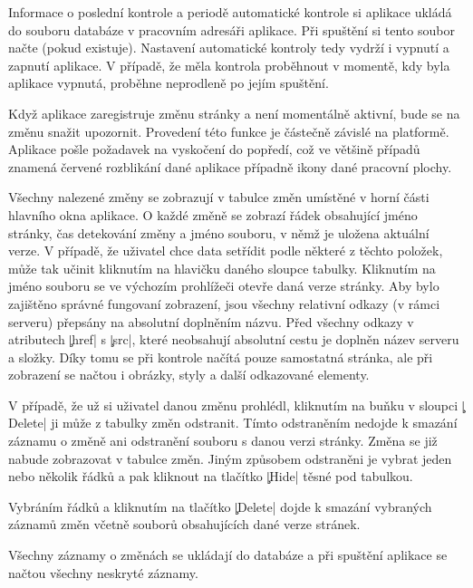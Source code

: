 Informace o poslední kontrole a periodě automatické kontrole si aplikace ukládá do souboru databáze v pracovním adresáři aplikace.
Při spuštění si tento soubor načte (pokud existuje).
Nastavení automatické kontroly tedy vydrží i vypnutí a zapnutí aplikace.
V případě, že měla kontrola proběhnout v momentě, kdy byla aplikace vypnutá, proběhne neprodleně po jejím spuštění.

Když aplikace zaregistruje změnu stránky a není momentálně aktivní, bude se na změnu snažit upozornit.
Provedení této funkce je částečně závislé na platformě. 
Aplikace pošle požadavek na vyskočení do popředí, což ve většině případů znamená červené rozblikání dané aplikace případně ikony dané pracovní plochy.

Všechny nalezené změny se zobrazují v tabulce změn umístěné v horní části hlavního okna aplikace.
O každé změně se zobrazí řádek obsahující jméno stránky, čas detekování změny a jméno souboru, v němž je uložena aktuální verze.
V případě, že uživatel chce data setřídit podle některé z těchto položek, může tak učinit kliknutím na hlavičku daného sloupce tabulky.
Kliknutím na jméno souboru se ve výchozím prohlížeči otevře daná verze stránky.
Aby bylo zajištěno správné fungovaní zobrazení, jsou všechny relativní odkazy (v rámci serveru) přepsány na absolutní doplněním názvu.
Před všechny odkazy v atributech \c|href| s \c|src|, které neobsahují absolutní cestu je doplněn název serveru a složky.
Díky tomu se při kontrole načítá pouze samostatná stránka, ale při zobrazení se načtou i obrázky, styly a další odkazované elementy.

V případě, že už si uživatel danou změnu prohlédl, kliknutím na buňku v sloupci \c|Delete| ji může z tabulky změn odstranit.
Tímto odstraněním nedojde k smazání záznamu o změně ani odstranění souboru s danou verzi stránky.
Změna se již nabude zobrazovat v tabulce změn.
Jiným způsobem odstraněni je vybrat jeden nebo několik řádků a pak kliknout na tlačítko \c|Hide| těsné pod tabulkou.

Vybráním řádků a kliknutím na tlačítko \c|Delete| dojde k smazání vybraných záznamů změn včetně souborů obsahujících dané verze stránek.

Všechny záznamy o změnách se ukládají do databáze a při spuštění aplikace se načtou všechny neskryté záznamy. 
